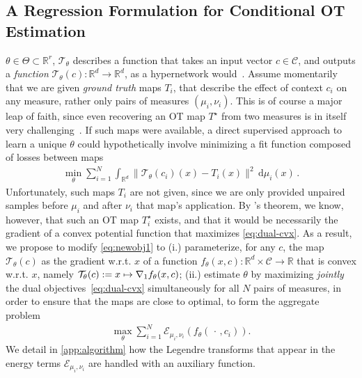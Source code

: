 \subsection{A Regression Formulation for Conditional OT Estimation}
 $\theta\in\Theta\subset\mathbb{R}^r$, $\mathcal{T}_\theta$ describes a function that takes an input vector $c\in\mathcal{C}$, and outputs a \textit{function} $\mathcal{T}_\theta(c):\mathbb{R}^d\rightarrow\mathbb{R}^d$, as a hypernetwork would~\citep{ha2016hypernetworks}. Assume momentarily that we are given \textit{ground truth} maps $T_i$, that describe the effect of context $c_i$ on any measure, rather only pairs of measures $(\mu_i,\nu_i)$. This is of course a major leap of faith, since even recovering an OT map $T^\star$ from two measures is in itself very challenging~\citep{hutter2021minimax,rigollet2022sample,pooladian2021entropic}. If such maps were available, a direct supervised approach to learn a unique $\theta$ could hypothetically involve minimizing a fit function composed of losses between maps
\begin{align}\label{eq:newobj1}
\min_\theta \sum_{i=1}^N \int_{\mathbb{R}^d} \|\mathcal{T}_{\theta}(c_i)(x) - T_i(x)\|^2\, \mathrm{d}\mu_i(x)\,.
\end{align}
Unfortunately, such maps $T_i$ are not given, since we are only provided unpaired samples before $\mu_i$ and after $\nu_i$ that map's application.
By \citeauthor{brenier1987decomposition}'s theorem, we know, however, that such an OT map $T^\star_i$ exists, and that it would be necessarily the gradient of a convex potential function that maximizes \eqref{eq:dual-cvx}. As a result, we propose to modify \eqref{eq:newobj1} to (i.) parameterize, for any $c$, the map $\mathcal{T}_\theta(c)$ as the gradient w.r.t. $x$ of a function $f_\theta(x,c):\mathbb{R}^d\times \mathcal{C}\rightarrow \mathbb{R}$ that is convex w.r.t. $x$, namely $\mathcal{T}_\theta(c) := x \mapsto \nabla_1 f_\theta(x,c)$; (ii.) estimate $\theta$ by maximizing \textit{jointly} the dual objectives~\eqref{eq:dual-cvx} simultaneously for all $N$ pairs of measures, in order to ensure that the maps are close to optimal, to form the aggregate problem
\begin{align}\label{eq:supdual} 
\textstyle \max_\theta \sum_{i=1}^N \mathcal{E}_{\mu_i,\nu_i}(f_{\theta}(\,\cdot\,, c_i)).
\end{align}
We detail in \ref{app:algorithm} how the Legendre transforms that appear in the energy terms $\mathcal{E}_{\mu_i,\nu_i}$ are handled with an auxiliary function.

